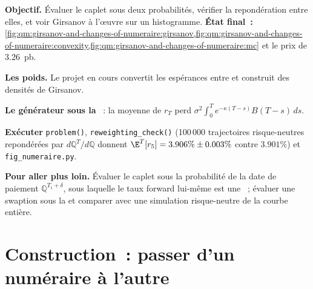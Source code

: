 \begin{tutorial}
\textbf{Objectif.} Évaluer le caplet sous deux probabilités, vérifier la repondération entre elles, et voir
Girsanov à l'œuvre sur un histogramme. \textbf{État final~:}
\cref{fig:qm:girsanov-and-changes-of-numeraire:girsanov,fig:qm:girsanov-and-changes-of-numeraire:convexity,fig:qm:girsanov-and-changes-of-numeraire:mc}
et le prix de 3.26~pb.
\begin{tutsteps}
\item \textbf{Les poids.} Le projet en cours convertit les espérances entre  et construit
des densités de Girsanov.
\label{lst:qm:girsanov-and-changes-of-numeraire:weights}
\item \textbf{Le générateur sous la }~: la moyenne de $r_{T}$ perd $\sigma^2\int_0^Te^{-\kappa(T-s)}B(T - s)\,ds$.
\label{lst:qm:girsanov-and-changes-of-numeraire:forward}
\item \textbf{Exécuter} \texttt{problem()}, \texttt{reweighting\_check()} (100\,000 trajectoires risque-neutres
repondérées par $d\mathbb Q^{T}/d\mathbb Q$ donnent $\E^{T}[r_5] = 3.906\% \pm 0.003\%$ contre $3.901\%$) et
\texttt{fig\_numeraire.py}.
\end{tutsteps}
\textbf{Pour aller plus loin.} Évaluer le caplet sous la probabilité de la date de paiement $\mathbb Q^{T_1 + \delta}$, sous
laquelle le taux forward lui-même est une ~; évaluer une swaption sous la  et
comparer avec une simulation risque-neutre de la courbe entière.
\end{tutorial}

\section{Construction~: passer d'un numéraire à l'autre}\label{bld:qm:girsanov-and-changes-of-numeraire:numeraire}

